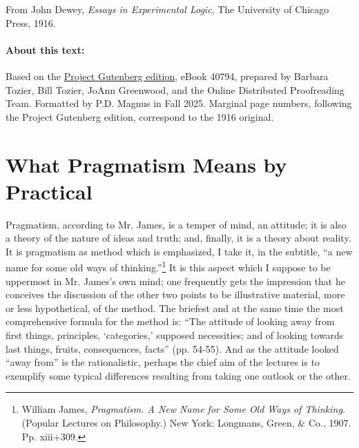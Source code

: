\documentclass[12pt]{article}
\begin{document}

\setlength{\parskip}{4pt}
\setlength{\parindent}{0pt}


From John Dewey, \emph{Essays in Experimental Logic}, The University of Chicago Press, 1916.


\paragraph{About this text:}
Based on the \href{https://www.gutenberg.org/ebooks/40794}{Project Gutenberg edition}, eBook 40794, prepared by Barbara Tozier, Bill Tozier, JoAnn Greenwood, and the Online Distributed Proofreading Team. Formatted by P.D. Magnus in Fall 2025. Marginal page numbers, following the Project Gutenberg edition, correspond to the 1916 original.





\providecommand*{\marginpage}[1]{\marginpar{\tiny #1}}

\section*{What Pragmatism Means by Practical}

\marginpage{303}
Pragmatism, according to Mr. James, is a temper of mind, an attitude;
it is also a theory of the nature of ideas and truth; and, finally, it
is a theory about reality. It is pragmatism as method which is
emphasized, I take it, in the subtitle, ``a new name for some old ways
of thinking.''\footnote{William James, \emph{Pragmatism. A New Name for Some Old Ways
of Thinking.} (Popular Lectures on Philosophy.) New York: Longmans,
Green, {\&} Co., 1907. Pp. xiii+309.} It is this aspect which I suppose to be uppermost in
Mr. James's own mind; one frequently gets the impression that he
conceives the discussion of the other two points to be illustrative
material, more or less hypothetical, of the method. The briefest and
at the same time the most comprehensive formula for the method is:
``The attitude of looking away from first things, principles,
`categories,' supposed necessities; and of looking towards last
things, fruits, consequences, facts'' (pp. 54-55). And as the attitude
looked ``away from'' is the rationalistic, perhaps the chief aim of the
lectures is to exemplify some typical differences resulting from
taking one outlook or the other.
\end{document}
